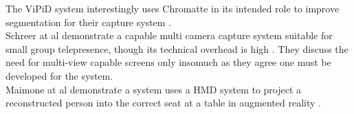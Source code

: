 The ViPiD system interestingly uses Chromatte in its intended role to improve segmentation for their capture system \cite{Klie2006}. \\
Schreer at al demonstrate a capable multi camera capture system suitable for small group telepresence, though its technical overhead is high \cite{Schreer:2008ty}. They discuss the need for multi-view capable screens only insomuch as they agree one must be developed for the system.\\
Maimone at al demonstrate a system uses a HMD system to project a reconstructed person into the correct seat at a table in augmented reality \cite{Maimone2013}.\\
                        

            


